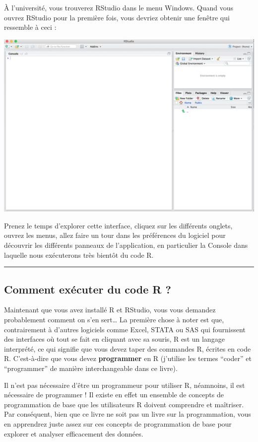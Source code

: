 \documentclass[a4paperpaper,]{article}
\begin{document}
À l'université, vous trouverez RStudio dans le menu Windows. Quand vous ouvrez RStudio pour la première fois, vous devriez obtenir une fenêtre qui ressemble à ceci :

\includegraphics{images/rstudio.png}

Prenez le temps d'explorer cette interface, cliquez sur les différents onglets, ouvrez les menus, allez faire un tour dans les préférences du logiciel pour découvrir les différents panneaux de l'application, en particulier la Console dans laquelle nous exécuterons très bientôt du code R.

\begin{center}\rule{0.5\linewidth}{\linethickness}\end{center}

\hypertarget{code}{%
\subsection{Comment exécuter du code R ?}\label{code}}

Maintenant que vous avez installé R et RStudio, vous vous demandez probablement comment on s'en sert\ldots{} La première chose à noter est que, contrairement à d'autres logiciels comme Excel, STATA ou SAS qui fournissent des interfaces où tout se fait en cliquant avec sa souris, R est un langage interprété, ce qui signifie que vous devez taper des commandes R, écrites en code R. C'est-à-dire que vous devez \textbf{programmer} en R (j'utilise les termes ``coder'' et ``programmer'' de manière interchangeable dans ce livre).

Il n'est pas nécessaire d'être un programmeur pour utiliser R, néamnoins, il est nécessaire de programmer ! Il existe en effet un ensemble de concepts de programmation de base que les utilisateurs R doivent comprendre et maîtriser. Par conséquent, bien que ce livre ne soit pas un livre sur la programmation, vous en apprendrez juste assez sur ces concepts de programmation de base pour explorer et analyser efficacement des données.
\end{document}
